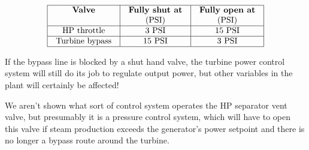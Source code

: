 






$$\vbox{\offinterlineskip
\halign{\strut
\vrule \quad\hfil # \ \hfil & 
\vrule \quad\hfil # \ \hfil & 
\vrule \quad\hfil # \ \hfil \vrule \cr
\noalign{\hrule}
%
{\bf Valve} & {\bf Fully shut at} & {\bf Fully open at} \cr
 & (PSI) & (PSI) \cr
%
\noalign{\hrule}
%
HP throttle & 3 PSI & 15 PSI \cr
%
\noalign{\hrule}
%
Turbine bypass & 15 PSI & 3 PSI \cr
%
\noalign{\hrule}
} %
}$$ %

If the bypass line is blocked by a shut hand valve, the turbine power control system will still do its job to regulate output power, but other variables in the plant will certainly be affected!







We aren't shown what sort of control system operates the HP separator vent valve, but presumably it is a pressure control system, which will have to open this valve if steam production exceeds the generator's power setpoint and there is no longer a bypass route around the turbine.



